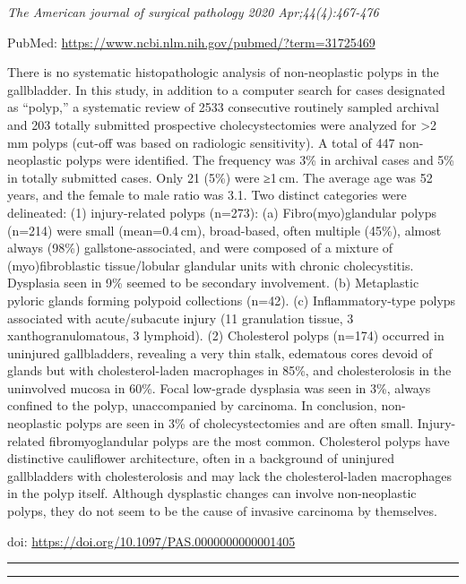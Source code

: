 \documentclass[
]{article}
\begin{document}
\emph{The American journal of surgical pathology 2020 Apr;44(4):467-476}

PubMed: \url{https://www.ncbi.nlm.nih.gov/pubmed/?term=31725469}

There is no systematic histopathologic analysis of non-neoplastic polyps
in the gallbladder. In this study, in addition to a computer search for
cases designated as ``polyp,'' a systematic review of 2533 consecutive
routinely sampled archival and 203 totally submitted prospective
cholecystectomies were analyzed for \textgreater2 mm polyps (cut-off was
based on radiologic sensitivity). A total of 447 non-neoplastic polyps
were identified. The frequency was 3\% in archival cases and 5\% in
totally submitted cases. Only 21 (5\%) were ≥1 cm. The average age was
52 years, and the female to male ratio was 3.1. Two distinct categories
were delineated: (1) injury-related polyps (n=273): (a)
Fibro(myo)glandular polyps (n=214) were small (mean=0.4 cm),
broad-based, often multiple (45\%), almost always (98\%)
gallstone-associated, and were composed of a mixture of
(myo)fibroblastic tissue/lobular glandular units with chronic
cholecystitis. Dysplasia seen in 9\% seemed to be secondary involvement.
(b) Metaplastic pyloric glands forming polypoid collections (n=42). (c)
Inflammatory-type polyps associated with acute/subacute injury (11
granulation tissue, 3 xanthogranulomatous, 3 lymphoid). (2) Cholesterol
polyps (n=174) occurred in uninjured gallbladders, revealing a very thin
stalk, edematous cores devoid of glands but with cholesterol-laden
macrophages in 85\%, and cholesterolosis in the uninvolved mucosa in
60\%. Focal low-grade dysplasia was seen in 3\%, always confined to the
polyp, unaccompanied by carcinoma. In conclusion, non-neoplastic polyps
are seen in 3\% of cholecystectomies and are often small. Injury-related
fibromyoglandular polyps are the most common. Cholesterol polyps have
distinctive cauliflower architecture, often in a background of uninjured
gallbladders with cholesterolosis and may lack the cholesterol-laden
macrophages in the polyp itself. Although dysplastic changes can involve
non-neoplastic polyps, they do not seem to be the cause of invasive
carcinoma by themselves.

doi: \url{https://doi.org/10.1097/PAS.0000000000001405}

\begin{center}\rule{0.5\linewidth}{0.5pt}\end{center}

\begin{center}\rule{0.5\linewidth}{0.5pt}\end{center}
\end{document}
